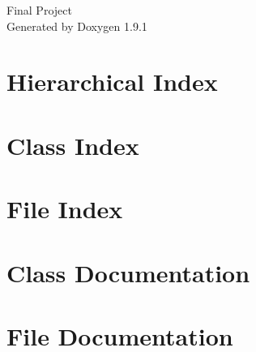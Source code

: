 \let\mypdfximage\pdfximage\def\pdfximage{\immediate\mypdfximage}\documentclass[twoside]{book}
\newcommand{\+}{\discretionary{\mbox{\scriptsize$\hookleftarrow$}}{}{}}
\newcommand{\clearemptydoublepage}{%
  \newpage{\pagestyle{empty}\cleardoublepage}%
}
\begin{document}
\raggedbottom

\hypersetup{pageanchor=false,
             bookmarksnumbered=true,
             pdfencoding=unicode
            }
\begin{titlepage}
\vspace*{7cm}
\begin{center}%
{\Large Final Project }\\
\vspace*{1cm}
{\large Generated by Doxygen 1.9.1}\\
\end{center}
\end{titlepage}
\clearemptydoublepage
{}
\tableofcontents
\clearemptydoublepage
{}
\hypersetup{pageanchor=true}

\chapter{Hierarchical Index}

\chapter{Class Index}

\chapter{File Index}

\chapter{Class Documentation}





\chapter{File Documentation}
















\backmatter
\newpage
{}
\clearemptydoublepage
{}
\printindex
\end{document}

